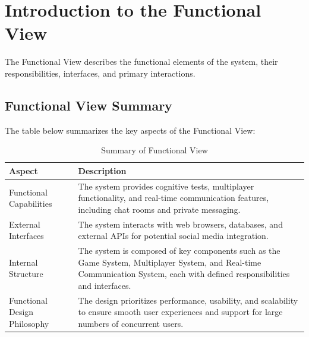 


% 


\section{Introduction to the Functional View}
The Functional View describes the functional elements of the system, their
responsibilities, interfaces, and primary interactions.

\subsection{Functional View Summary}

The table below summarizes the key aspects of the Functional View:

\begin{table}[H]
    \centering
    \caption{Summary of Functional View}
    \label{tab:functional_view_summary}
    \begin{tabular}{|p{}|p{}|}
        \hline
        \textbf{Aspect} & \textbf{Description} \\
        \hline
        Functional Capabilities & The system provides cognitive tests, multiplayer functionality, and real-time communication features, including chat rooms and private messaging. \\
        \hline
        External Interfaces & The system interacts with web browsers, databases, and external APIs for potential social media integration. \\
        \hline
        Internal Structure & The system is composed of key components such as the Game System, Multiplayer System, and Real-time Communication System, each with defined responsibilities and interfaces. \\
        \hline
        Functional Design Philosophy & The design prioritizes performance, usability, and scalability to ensure smooth user experiences and support for large numbers of concurrent users. \\
        \hline
    \end{tabular}
\end{table}

